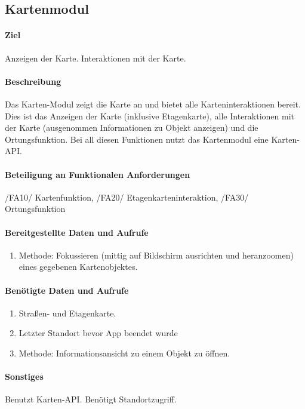 \subsection{Kartenmodul}
\paragraph{Ziel}
Anzeigen der Karte. Interaktionen mit der Karte.
\paragraph{Beschreibung}
Das Karten-Modul zeigt die Karte an und bietet alle Karteninteraktionen bereit.
Dies ist das Anzeigen der Karte (inklusive Etagenkarte), alle Interaktionen mit der Karte (ausgenommen Informationen zu Objekt anzeigen) und die Ortungsfunktion.
Bei all diesen Funktionen nutzt das Kartenmodul eine Karten-API.
\paragraph{Beteiligung an Funktionalen Anforderungen}
/FA10/ Kartenfunktion, /FA20/ Etagenkarteninteraktion, /FA30/ Ortungsfunktion
\paragraph{Bereitgestellte Daten und Aufrufe}
\begin{enumerate}
    \item Methode: Fokussieren (mittig auf Bildschirm ausrichten und heranzoomen) eines gegebenen Kartenobjektes.
\end{enumerate}
\paragraph{Benötigte Daten und Aufrufe}
\begin{enumerate}
    \item Straßen- und Etagenkarte.
    \item Letzter Standort bevor App beendet wurde
    \item Methode: Informationsansicht zu einem Objekt zu öffnen.
\end{enumerate}
\paragraph{Sonstiges}
Benutzt Karten-API. Benötigt Standortzugriff.